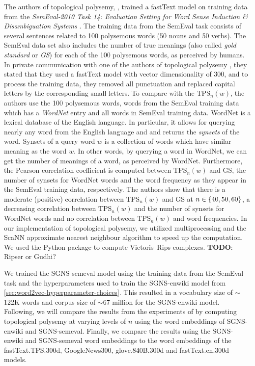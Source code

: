 The authors of topological polysemy, \cite{jakubowski2020topology}, trained a fastText model on training data from the \textit{SemEval-2010 Task 14: Evaluation Setting for Word Sense Induction \& Disambiguation Systems} \cite{manandhar-klapaftis-2009-semeval}. The training data from the SemEval task consists of several sentences related to 100 polysemous words (50 nouns and 50 verbs). The SemEval data set also includes the number of true meanings (also called \textit{gold standard} or \textit{GS}) for each of the 100 polysemous words, as perceived by humans. In private communication with one of the authors of topological polysemy \cite{ZibrowiusPrivComs2021}, they stated that they used a fastText model with vector dimensionality of 300, and to process the training data, they removed all punctuation and replaced capital letters by the corresponding small letters. To compare with the $\text{TPS}_n(w)$, the authors use the 100 polysemous words, words from the SemEval training data which has a \textit{WordNet} \cite{fellbaum1998} entry and all words in SemEval training data. WordNet is a lexical database of the English language. In particular, it allows for querying nearly any word from the English language and and returns the \textit{synsets} of the word. Synsets of a query word $w$ is a collection of words which have similar meaning as the word $w$. In other words, by querying a word in WordNet, we can get the number of meanings of a word, as perceived by WordNet. Furthermore, the Pearson correlation coefficient \cite{James2013} is computed between $\text{TPS}_n(w)$ and GS, the number of synsets for WordNet words and the word frequency as they appear in the SemEval training data, respectively. The authors show that there is a moderate (positive) correlation between $\text{TPS}_n(w)$ and GS at $n \in \left\{40, 50, 60\right\}$, a decreasing correlation between $\text{TPS}_n(w)$ and the number of synsets for WordNet words and no correlation between $\text{TPS}_n(w)$ and word frequencies. In our implementation of topological polysemy, we utilized multiprocessing and the ScaNN \cite{scann2020} approximate nearest neighbour algorithm to speed up the computation. We used the  \cite{ctralie2018ripser} Python package to compute Vietoris–Rips complexes. \textbf{TODO}: Ripser or Gudhi?

We trained the SGNS-semeval model using the training data from the SemEval task and the hyperparameters used to train the SGNS-enwiki model from \cref{sec:word2vec-hyperparameter-choices}. This resulted in a vocabulary size of $\sim$122K words and corpus size of $\sim$67 million for the SGNS-enwiki model. Following, we will compare the results from the experiments of \cite{jakubowski2020topology} by computing topological polysemy at varying levels of $n$ using the word embeddings of SGNS-enwiki and SGNS-semeval. Finally, we compare the results using the SGNS-enwiki and SGNS-semeval word embeddings to the word embeddings of the fastText.TPS.300d, GoogleNews300, glove.840B.300d and fastText.en.300d models.

